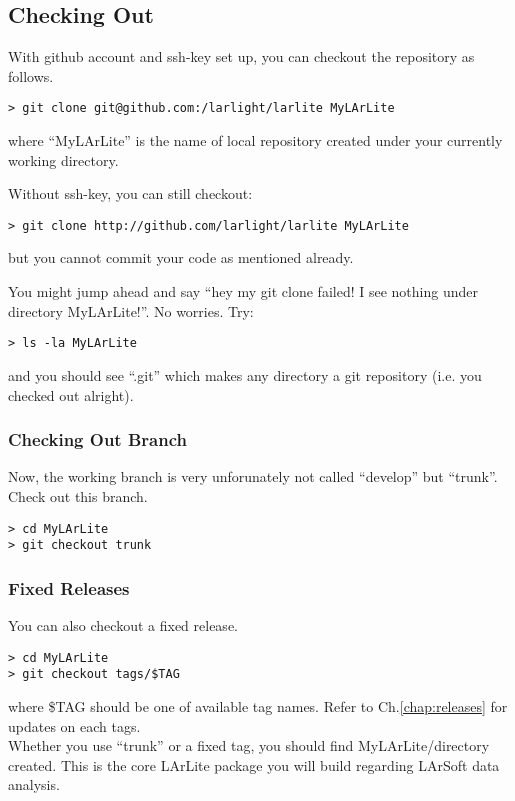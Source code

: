 \subsection{Checking Out}

With github account and ssh-key set up, you can checkout the repository as follows.
\begin{lstlisting}
> git clone git@github.com:/larlight/larlite MyLArLite
\end{lstlisting}
where ``MyLArLite'' is the name of local repository created under your currently working directory.

Without ssh-key, you can still checkout:
\begin{lstlisting}
> git clone http://github.com/larlight/larlite MyLArLite
\end{lstlisting}
but you cannot commit your code as mentioned already.

You might jump ahead and say ``hey my git clone failed! I see nothing under directory MyLArLite!''.
No worries. Try:
\begin{lstlisting}
> ls -la MyLArLite
\end{lstlisting}
and you should see ``.git'' which makes any directory a git repository (i.e. you checked out alright).

\subsubsection{Checking Out Branch}
Now, the working branch is very unforunately not called ``develop'' but ``trunk''.
Check out this branch.
\begin{lstlisting}
> cd MyLArLite
> git checkout trunk
\end{lstlisting}

\subsubsection{Fixed Releases}
You can also checkout a fixed release. 
\begin{lstlisting}
> cd MyLArLite
> git checkout tags/$TAG
\end{lstlisting}
where {\ttfamily \$TAG} should be one of available tag names.
Refer to Ch.\ref{chap:releases} for updates on each tags.\\


Whether you use ``trunk'' or a fixed tag, you should find {\ttfamily MyLArLite/}\Core directory created. 
This is the core LArLite package you will build regarding LArSoft data analysis.

